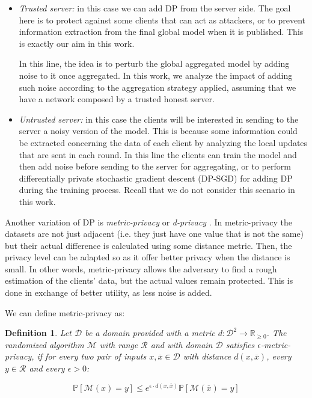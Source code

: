 \documentclass[5p,times]{elsarticle}
\newtheorem{definition}{Definition}
\begin{document}
\begin{itemize}
    \item \textit{Trusted server:} in this case we can add DP from the server side. The goal here is to protect against some clients that can act as attackers, or to prevent information extraction from the final global model when it is published. This is exactly our aim in this work.
    
    In this line, the idea is to perturb the global aggregated model by adding noise to it once aggregated. In this work, we analyze the impact of adding such noise according to the aggregation strategy applied, assuming that we have a network composed by a trusted honest server. %

    \item \textit{Untrusted server:} in this case the clients will be interested in sending to the server a noisy version of the model. This is because some information could be extracted concerning the data of each client by analyzing the local updates that are sent in each round. In this line the clients can train the model and then add noise before sending to the server for aggregating, or to perform differentially private stochastic gradient descent (DP-SGD) for adding DP during the training process. Recall that we do not consider this scenario in this work.
\end{itemize}

Another variation of DP is  \textit{metric-privacy} or \textit{d-privacy} \cite{dprivacy, galli2023group}. In metric-privacy the datasets are not just adjacent (i.e.  they just have one value that is not the same) but their actual difference is calculated using some distance metric. Then, the privacy level can be adapted so as it offer better privacy when the distance is small. In other words, metric-privacy allows the adversary to find a rough estimation of the clients' data, but the actual values remain protected. This is done in exchange of better utility, as less noise is added.

We can define metric-privacy as:



\begin{definition}

Let $\mathcal{D}$ be a domain provided with a metric $d:\mathcal{D}^{2}\longrightarrow \mathbb{R}_{\geq 0}$. 
The randomized algorithm $\mathcal{M}$ with range $\mathcal{R}$ and with domain $\mathcal{D}$ satisfies $\epsilon$-metric-privacy, if for every two pair of inputs $x,\overline{x} \in \mathcal{D}$ with distance $d(x,\overline{x})$, every $y \in \mathcal{R}$ and every $\epsilon>0$:

$$
\mathbb{P}[\mathcal{M}(x)=y] \leq e^{\epsilon\cdot d(x,\overline{x})}\mathbb{P}[\mathcal{M}(\overline{x})=y]
$$    
\end{definition}
\end{document}
